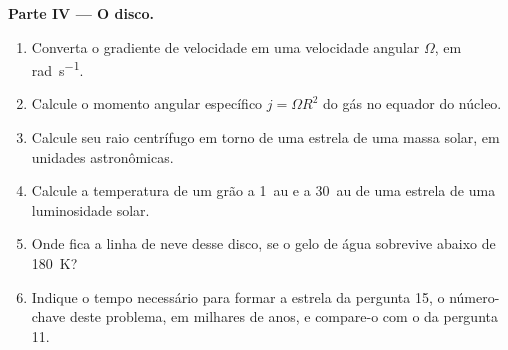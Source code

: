 \begin{problem}
\noindent\textbf{Parte IV --- O disco.}
\begin{enumerate}[resume]
  \item Converta o gradiente de velocidade em uma velocidade angular $\Omega$, em
        \unit{rad.s^{-1}}.
  \item Calcule o momento angular específico $j = \Omega R^2$ do gás no
        equador do núcleo.
  \item Calcule seu raio centrífugo em torno de uma estrela de uma massa solar, em
        unidades astronômicas.
  \item Calcule a temperatura de um grão a \qty{1}{au} e a \qty{30}{au}
        de uma estrela de uma luminosidade solar.
  \item Onde fica a linha de neve desse disco, se o gelo de água sobrevive abaixo de
        \qty{180}{K}?
  \item Indique o tempo necessário para formar a estrela da pergunta 15, o número-chave
        deste problema, em milhares de anos, e compare-o com o
         da pergunta 11.
\end{enumerate}
\end{problem}
